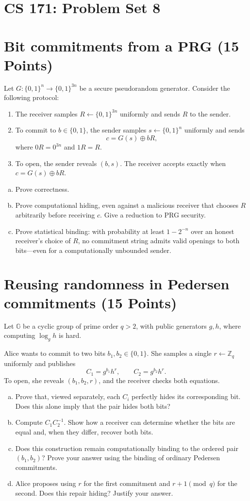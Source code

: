 \documentclass[11pt]{article}
\begin{document}
\section*{CS 171: Problem Set 8}

\section{Bit commitments from a PRG (15 Points)}
Let $G:\{0,1\}^{n}\to\{0,1\}^{3n}$ be a secure pseudorandom generator. Consider the following protocol:
\begin{enumerate}
\item The receiver samples $R\leftarrow\{0,1\}^{3n}$ uniformly and sends $R$ to the sender.
\item To commit to $b\in\{0,1\}$, the sender samples $s\leftarrow\{0,1\}^{n}$ uniformly and sends
\[c=G(s)\oplus bR,\]
where $0R=0^{3n}$ and $1R=R$.
\item To open, the sender reveals $(b,s)$. The receiver accepts exactly when $c=G(s)\oplus bR$.
\end{enumerate}
\begin{enumerate}[(a)]
\item Prove correctness.
\item Prove computational hiding, even against a malicious receiver that chooses $R$ arbitrarily before receiving $c$. Give a reduction to PRG security.
\item Prove statistical binding: with probability at least $1-2^{-n}$ over an honest receiver's choice of $R$, no commitment string admits valid openings to both bits---even for a computationally unbounded sender.
\end{enumerate}

\section{Reusing randomness in Pedersen commitments (15 Points)}
Let $\mathbb G$ be a cyclic group of prime order $q>2$, with public generators $g,h$, where computing $\log_g h$ is hard.

Alice wants to commit to two bits $b_1,b_2\in\{0,1\}$. She samples a single $r\leftarrow\mathbb Z_q$ uniformly and publishes
\[C_1=g^{b_1}h^r,\qquad C_2=g^{b_2}h^r.\]
To open, she reveals $(b_1,b_2,r)$, and the receiver checks both equations.
\begin{enumerate}[(a)]
\item Prove that, viewed separately, each $C_i$ perfectly hides its corresponding bit. Does this alone imply that the pair hides both bits?
\item Compute $C_1C_2^{-1}$. Show how a receiver can determine whether the bits are equal and, when they differ, recover both bits.
\item Does this construction remain computationally binding to the ordered pair $(b_1,b_2)$? Prove your answer using the binding of ordinary Pedersen commitments.
\item Alice proposes using $r$ for the first commitment and $r+1\pmod q$ for the second. Does this repair hiding? Justify your answer.
\end{enumerate}
\end{document}

